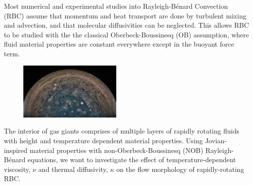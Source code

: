 Most numerical and experimental studies into Rayleigh-B\'enard Convection (RBC) assume that momentum and heat transport are done by turbulent mixing and advection, and that molecular diffusivities can be neglected. This allows RBC to be studied with the the classical Oberbeck-Boussinesq (OB) assumption, where fluid material properties are constant everywhere except in the buoyant force term. \cite{Glatzmaier2014} 

\begin{figure}[H]
	\includegraphics[width=0.45\textwidth]{img/juno-jupitersp.png}
\end{figure}

The interior of gas giants comprises of multiple layers of rapidly rotating fluids with height and temperature dependent material properties. Using Jovian-inspired material properties with non-Oberbeck-Boussinesq (NOB) Rayleigh-B\'enard equations, we want to investigate the effect of temperature-dependent viscosity, $\nu$ and thermal diffusivity, $\kappa$ on the flow morphology of rapidly-rotating RBC.









